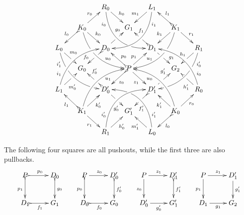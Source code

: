 \begin{lemma}
\begin{enumerate}
		\[\xymatrix@C=15pt@R=15pt{&&R_0 \ar@/_.8cm/[ddrr]_(.2){i_0}|(.7)\hole
			\ar[dr]^{h_0}&& L_1\ar@/^.8cm/[ddll]^(.2){i_1}
			\ar[dl]_{m_1}\\&K_0\ar[dr]^{k_0}\ar@{>->}[dl]_{l_0}
			\ar@/_.6cm/[ddrr]|(.36)\hole^(.65){u_0}\ar[ur]^{r_0}&& G_1 &&
			K_1
			\ar@/^.6cm/[ddll]|(.36)\hole_(.65){u_1}\ar[dl]_{k_1}\ar@{>->}[lu]_{l_1}
			\ar[dr]^{r_1}\\L_0
			\ar@/_.6cm/[ddrr]_(.2){i'_1}|(.31)\hole|(.81)\hole
			\ar[dr]^(.4){m_0}|(.61)\hole && D_0
			\ar@{>->}[dl]|(.4)\hole_(.65){f_0}\ar[ur]|(.5)\hole^(.7){g_0}&&D_1
			\ar[dr]|(.4)\hole^(.65){g_1}
			\ar@{>->}[ul]|(.5)\hole_(.65){f_1}&&R_1\ar@/^.6cm/[ddll]^(.2){i'_0}|(.31)\hole|(.81)\hole\ar[dl]_{h_1}|(.6)\hole\\&G_0
			&&P\ar@{>}[dr]_{z_1}	\ar@{>->}[dl]^{z_0}\ar[ur]^(.4){p_1}\ar@{>->}[ul]_(.4){p_0}&&G_2\\L_1	\ar@/^.6cm/[uurr]^(.2){i_1} \ar[ur]_(.35){m'_0}|(.61)\hole && D'_0	\ar@{>->}[ul]|(.4)\hole_(.65){f'_0}\ar[dr]|(.5)\hole_(.65){g'_0}	&&D'_1\ar[ur]|(.4)\hole^(.65){g'_1} \ar@{>->}[dl]|(.5)\hole^(.65){f'_1}	&& R_0 \ar[ul]^(.35){h'_1}|(.61)\hole\ar@/_.6cm/[uull]_(.2){i_0}\\ &K_1	\ar[ur]_{k'_0} \ar[dr]_{r_1}	\ar@{>->}[ul]^{l_1}\ar@/^.6cm/[uurr]_(.65){u_1}&&G'_1&& K_0\ar[ur]_{r_0} \ar[ul]^{k'_1} \ar@{>->}[dl]^{l_0} \ar@/_.6cm/[uull]^(.65){u_0}\\&& R_1	\ar[ur]_{h'_0}\ar@/^.8cm/[uurr]^(.2){i'_0}&& L_0 \ar[ul]^{m'_1} \ar@/_.8cm/[uull]_(.2){i'_1} |(.69)\hole }\] 
		
		The following four squares are all pushouts, while the first three are also pullbacks. 
		\[\xymatrix{P \ar@{>->}[r]^{p_0} \ar@{>->}[d]_{p_1}& D_0 \ar@{>->}[d]^{g_0}  & P \ar@{>}[r]^{z_0} \ar@{>->}[d]_{p_0}& D'_0 \ar@{>->}[d]^{f'_0} &  P \ar@{->}[d]_{z_0} \ar[r]^{z_1} & D'_1 \ar@{>->}[d]^{f'_1} & P\ar[r]^{z_1} \ar[d]_{p_1}&D'_1 \ar[d]^{g'_1}\\ D_1 \ar@{>->}[r]_{f_1} & G_1  & D_0 \ar@{>->}[r]_{f_0} & G_0 & D'_0 \ar[r]_{g'_0}& G'_1 & D_1 \ar[r]_{g_1}& G_2}\]	
	\end{enumerate}
\end{lemma}
